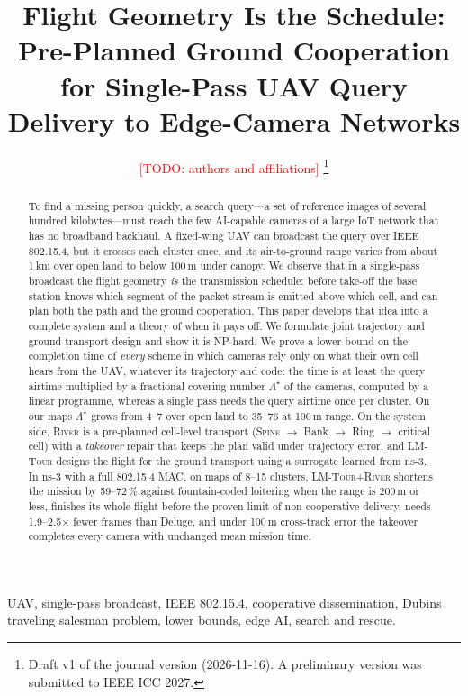 \documentclass[journal,10pt]{IEEEtran}
\theoremstyle{definition}
\theoremstyle{remark}
\newcommand{\todo}[1]{\textcolor{red}{[TODO: #1]}}
\newcommand{\spine}{\textsc{Spine}}
\newcommand{\lmtour}{\textsc{LM-Tour}}
\begin{document}
\title{Flight Geometry Is the Schedule: Pre-Planned Ground Cooperation for Single-Pass UAV Query Delivery to Edge-Camera Networks}
\author{\todo{authors and affiliations}%
\thanks{Draft v1 of the journal version (2026-11-16). A preliminary version was submitted to IEEE ICC 2027.}}
\maketitle

\begin{abstract}
To find a missing person quickly, a search query---a set of reference images of several hundred kilobytes---must reach
the few AI-capable cameras of a large IoT network that has no broadband backhaul. A fixed-wing UAV can broadcast the
query over IEEE 802.15.4, but it crosses each cluster once, and its air-to-ground range varies from about 1\,km over open
land to below 100\,m under canopy. We observe that in a single-pass broadcast the flight geometry \emph{is} the
transmission schedule: before take-off the base station knows which segment of the packet stream is emitted above which
cell, and can plan both the path and the ground cooperation. This paper develops that idea into a complete system and a
theory of when it pays off. We formulate joint trajectory and ground-transport design and show it is NP-hard. We prove a
lower bound on the completion time of \emph{every} scheme in which cameras rely only on what their own cell hears from the
UAV, whatever its trajectory and code: the time is at least the query airtime multiplied by a fractional covering number
$\Lambda^\star$ of the cameras, computed by a linear programme, whereas a single pass needs the query airtime once per
cluster. On our maps $\Lambda^\star$ grows from 4--7 over open land to 35--76 at 100\,m range. On the system side,
\textsc{River} is a pre-planned cell-level transport (\spine{} $\to$ Bank $\to$ Ring $\to$ critical cell) with a
\emph{takeover} repair that keeps the plan valid under trajectory error, and \lmtour{} designs the flight for the ground
transport using a surrogate learned from ns-3. In ns-3 with a full 802.15.4 MAC, on maps of 8--15 clusters,
\lmtour{}+\textsc{River} shortens the mission by 59--72\,\% against fountain-coded loitering when the range is 200\,m or
less, finishes its whole flight before the proven limit of non-cooperative delivery, needs 1.9--2.5$\times$ fewer frames
than Deluge, and under 100\,m cross-track error the takeover completes every camera with unchanged mean mission time.
\end{abstract}
\begin{IEEEkeywords}
UAV, single-pass broadcast, IEEE 802.15.4, cooperative dissemination, Dubins traveling salesman problem, lower bounds,
edge AI, search and rescue.
\end{IEEEkeywords}








\end{document}
